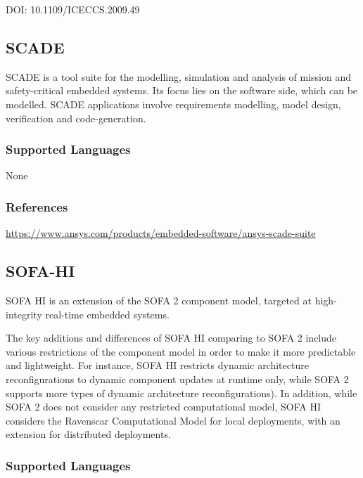DOI: 10.1109/ICECCS.2009.49


\subsection{SCADE}
\label{subsecT:SCADE}


SCADE is a tool suite for the modelling, simulation and analysis of mission and safety-critical embedded systems.
Its focus lies on the software side, which can be modelled.
SCADE applications involve requirements modelling, model design, verification and code-generation.

\subsubsection{Supported Languages}

None


\subsubsection{References}

\url{https://www.ansys.com/products/embedded-software/ansys-scade-suite}


\subsection{SOFA-HI}
\label{subsecT:SOFA-HI}


SOFA HI is an extension of the SOFA 2 component model, targeted at high-integrity real-time embedded systems.

The key additions and differences of SOFA HI comparing to SOFA 2 include various restrictions of the component model in order to make it more predictable and lightweight. For instance, SOFA HI restricts dynamic architecture reconfigurations to dynamic component updates at runtime only, while SOFA 2 supports more types of dynamic architecture reconfigurations). In addition, while SOFA 2 does not consider any restricted computational model, SOFA HI considers the Ravenscar Computational Model for local deployments, with an extension for distributed deployments.

\subsubsection{Supported Languages}

